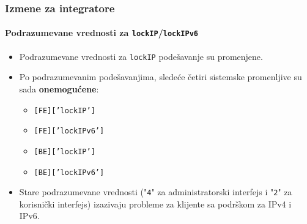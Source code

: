 \begin{frame}[fragile]
	\frametitle{Izmene za integratore}
	\framesubtitle{Podrazumevane vrednosti za \texttt{lockIP}/\texttt{lockIPv6}}

	\lstset{basicstyle=\smaller\ttfamily}

	\begin{itemize}
		\item Podrazumevane vrednosti za \texttt{lockIP} podešavanje su promenjene.
		\item Po podrazumevanim podešavanjima, sledeće četiri sistemske promenljive
		 		su sada \textbf{onemogućene}:

			\begin{itemize}
				\item \texttt{[FE]['lockIP']}
				\item \texttt{[FE]['lockIPv6']}
				\item \texttt{[BE]['lockIP']}
				\item \texttt{[BE]['lockIPv6']}
			\end{itemize}

		\item Stare podrazumevane vrednosti ("\texttt{4}" za administratorski interfejs
		     i "\texttt{2}" za korisnički interfejs) izazivaju probleme za klijente
				 sa podrškom za IPv4 i IPv6.

	\end{itemize}

\end{frame}


